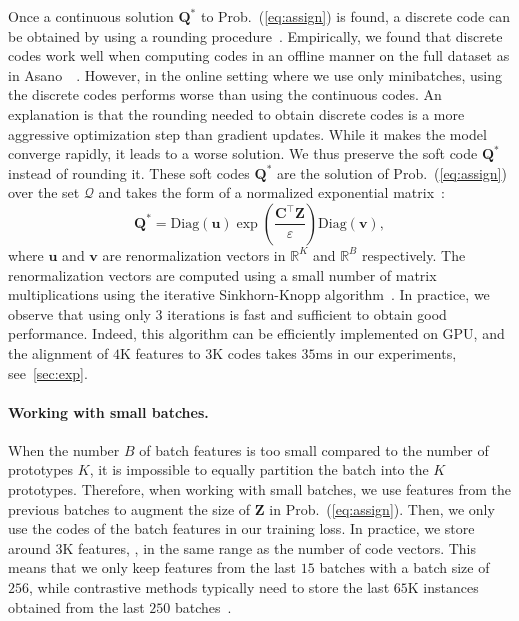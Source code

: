Once a continuous solution $\mathbf{Q}^*$ to Prob.~(\ref{eq:assign}) is found, a discrete code can be obtained by using a rounding procedure~\cite{asano2019self}.
Empirically, we found that discrete codes work well when computing codes in an offline manner on the full dataset as in Asano~\etal~\cite{asano2019self}.
However, in the online setting where we use only minibatches, using the discrete codes performs worse than using the continuous codes.
An explanation is that the rounding needed to obtain discrete codes is a more aggressive optimization step than gradient updates.
While it makes the model converge rapidly, it leads to a worse solution.
We thus preserve the soft code $\mathbf{Q}^*$ instead of rounding it. 
These soft codes $\mathbf{Q}^*$ are the solution of Prob.~(\ref{eq:assign}) over the set $\mathcal{Q}$ and takes the form of a normalized exponential matrix~\cite{cuturi2013sinkhorn}:
\begin{equation}
\label{eq:qstar}
  \mathbf{Q}^*= \text{Diag}(\mathbf{u}) \exp\left(\frac{\mathbf{C}^\top \mathbf{Z}}{\varepsilon} \right) \text{Diag}(\mathbf{v}),
\end{equation}
where $\mathbf{u}$ and $\mathbf{v}$ are renormalization vectors in $\mathbb{R}^K$ and $\mathbb{R}^B$ respectively.
The renormalization vectors are computed using a small number of matrix multiplications using the iterative Sinkhorn-Knopp algorithm~\cite{cuturi2013sinkhorn}.
In practice, we observe that using only $3$ iterations is fast and sufficient to obtain good performance.
Indeed, this algorithm can be efficiently implemented on GPU, and the alignment of $4$K features to $3$K codes takes $35$ms in our experiments, see~\cref{sec:exp}.

\paragraph{Working with small batches.}
When the number $B$ of batch features is too small compared to the number of prototypes $K$, it is impossible to equally partition the batch into the $K$ prototypes.
Therefore, when working with small batches, we use features from the previous batches to augment the size of $\mathbf{Z}$ in Prob.~(\ref{eq:assign}).
Then, we only use the codes of the batch features in our training loss.
In practice, we store around $3$K features, \ie, in the same range as the number of code vectors.
This means that we only keep features from the last $15$ batches with a batch size of $256$, while contrastive methods typically need to store the last $65$K instances obtained from the last $250$ batches~\cite{he2019momentum}.

